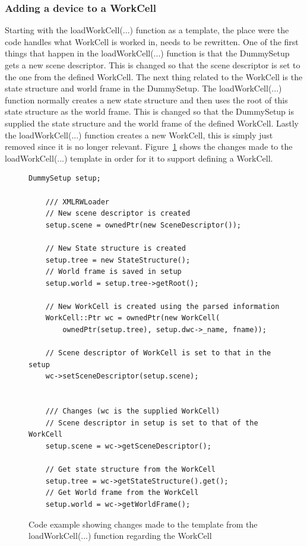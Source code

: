 \subsubsection{Adding a device to a WorkCell}
Starting with the loadWorkCell(...) function as a template, the place were the code handles what WorkCell is worked in, needs to be rewritten. One of the first things that happen in the loadWorkCell(...) function is that the DummySetup gets a new scene descriptor. This is changed so that the scene descriptor is set to the one from the defined WorkCell. The next thing related to the WorkCell is the state structure and world frame in the DummySetup. The loadWorkCell(...) function normally creates a new state structure and then uses the root of this state structure as the world frame. This is changed so that the DummySetup is supplied the state structure and the world frame of the defined WorkCell. Lastly the loadWorkCell(...) function creates a new WorkCell, this is simply just removed since it is no longer relevant. Figure~\ref{fig:ChangedInLoaderWorkCell} shows the changes made to the loadWorkCell(...) template in order for it to support defining a WorkCell.

\begin{figure}[h]
	\centering
	\lstset{language=C++} 
	\begin{lstlisting}[frame=single]
	DummySetup setup;
	
	/// XMLRWLoader
	// New scene descriptor is created
	setup.scene = ownedPtr(new SceneDescriptor());
	
	// New State structure is created
	setup.tree = new StateStructure();
	// World frame is saved in setup
	setup.world = setup.tree->getRoot();
	
	// New WorkCell is created using the parsed information
	WorkCell::Ptr wc = ownedPtr(new WorkCell(
		ownedPtr(setup.tree), setup.dwc->_name, fname));
		
	// Scene descriptor of WorkCell is set to that in the setup
	wc->setSceneDescriptor(setup.scene);
	
	
	/// Changes	(wc is the supplied WorkCell)
	// Scene descriptor in setup is set to that of the WorkCell
	setup.scene = wc->getSceneDescriptor();
	
	// Get state structure from the WorkCell
	setup.tree = wc->getStateStructure().get();
	// Get World frame from the WorkCell
	setup.world = wc->getWorldFrame();
	\end{lstlisting}
	\caption{Code example showing changes made to the template from the loadWorkCell(...) function regarding the WorkCell}
	\label{fig:ChangedInLoaderWorkCell}
\end{figure}

